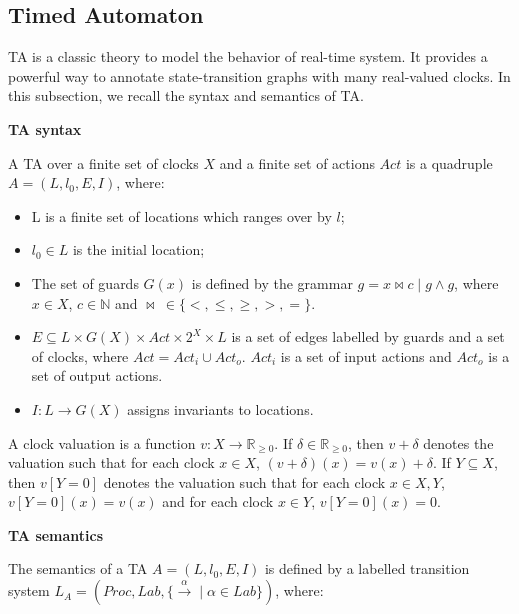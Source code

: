 \subsection{Timed Automaton}
TA \cite{BehrmannDLHPYH06} is a classic theory to model the behavior of real-time system. It provides a powerful way to annotate state-transition graphs with many real-valued clocks. In this subsection, we recall the syntax and semantics of TA. 
\begin{definition}
\textbf{TA syntax}

A TA over a finite set of clocks $X$ and a finite set of actions $Act$ is a quadruple $\textit{A}=(L,l_{0},E,I)$, where:
\end{definition}
\begin{itemize}
\item
L is a finite set of locations which ranges over by $l$;
\item
$l_{0} \in  L$ is the initial location;
\item
The set of guards $G(x)$ is defined by the grammar $g = x \bowtie c \mid g \land g$, where $x \in X$, $c \in \mathbb{N}$ and $\bowtie~\in \{<,\leqslant,\geqslant,>,=\}$. 
\item
$E \subseteq L \times G(X) \times Act \times 2^X \times L$ is a set of edges labelled by guards and a set of clocks, where $Act = Act_{i} \cup Act_{o}$. $Act_{i}$ is a set of input actions and $Act_{o}$ is a set of output actions.
\item
$I : L \rightarrow G(X)$ assigns invariants to locations.
\end{itemize}
A clock valuation is a function $v : X \rightarrow \mathbb{R}_{\geqslant{0}}$. If $\delta \in \mathbb{R}_{\geqslant{0}}$, then $v + \delta$ denotes the valuation such that for each clock $x \in X$, $(v + \delta)(x) = v(x) + \delta$. If $Y \subseteq X$, then $v[Y = 0]$ denotes the valuation such that for each clock $x \in X, Y$, $v[Y = 0](x) = v(x)$ and for each clock $x \in Y$, $v[Y = 0](x) = 0$.
\begin{definition}
\textbf{TA semantics} 

The semantics of a TA $\textit{A}=(L,l_{0},E,I)$ is defined by a labelled transition system $L_{\textit{A}} = (Proc,Lab,\lbrace {{\xrightarrow{\alpha}}} \mid \alpha \in Lab \rbrace)$, where:
\end{definition}
